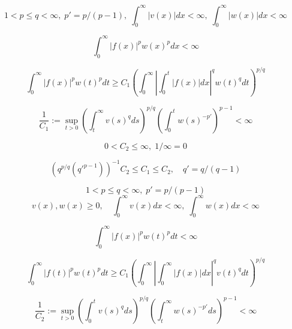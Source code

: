 $$
1<p\le q<\infty,\;p'=p/(p-1),\;\int^\infty_0|v(x)|dx<\infty,\;\int^\infty_0|w(x)|dx<\infty
$$

$$
\int^\infty_0|f(x)|^pw(x)^p dx<\infty
$$

$$
\int^\infty_0|f(x)|^p w(t)^p dt \ge C_1\left(\int^\infty_0\left|\int^t_0|f(x)|dx\right|^q w(t)^q dt\right)^{p/q}
$$

$$
\frac{1}{C_1}:=\sup_{t>0}\left(\int^\infty_t v(s)^q ds\right)^{p/q}\left(\int^t_0 w(s)^{-p'}\right)^{p-1}<\infty
$$

$$
0<C_2\le \infty,\; 1/\infty=0
$$

$$
\left(q^{p/q}(q'^{p-1})\right)^{-1}C_2 \le C_1 \le C_2,\quad q'=q/(q-1)
$$

$$
1<p \le q <\infty, \; p'=p/(p-1)
$$
$$
v(x),w(x) \ge 0, \quad \int^\infty_0 v(x) dx <\infty,\;\int^\infty_0 w(x) dx <\infty
$$

$$
\int^{\infty}_{0}|f(x)|^{p}w(t)^{p}dt<\infty
$$

$$
\int^{\infty}_{0}|f(t)|^{p}w(t)^{p}dt \ge C_{1}\left(\int^{\infty}_{0}\left|\int^{\infty}_{0}|f(x)|dx\right|^{q}v(t)^{q}dt\right)^{{p/q}}
$$

$$
\frac{1}{C_{2}}:=\sup_{t>0}\left(\int^{t}_{0}v(s)^{q}ds\right)^{p/q}\left(\int^{\infty}_{t}w(s)^{-p'}ds\right)^{p-1} < \infty
$$

